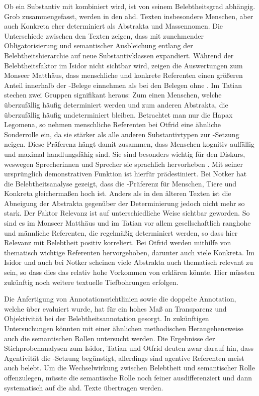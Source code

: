 Ob ein Substantiv mit  kombiniert wird, ist von seinem Belebtheitsgrad abhängig. Grob zusammengefasst, werden in den ahd. Texten insbesondere Menschen, aber auch Konkreta eher determiniert als Abstrakta und Massennomen. Die Unterschiede zwischen den Texten zeigen, dass  mit zunehmender Obligatorisierung und semantischer Ausbleichung entlang der Belebtheitshierarchie auf neue Substantivklassen expandiert. Während der Belebtheitsfaktor im Isidor nicht sichtbar wird, zeigen die Auswertungen zum Monseer Matthäus, dass menschliche und konkrete Referenten einen größeren Anteil innerhalb der -Belege einnehmen als bei den Belegen ohne . Im Tatian stechen zwei Gruppen signifikant heraus: Zum einen Menschen, welche überzufällig häufig determiniert werden und zum anderen Abstrakta, die überzufällig häufig undeterminiert bleiben. Betrachtet man nur die Hapax Legomena, so nehmen menschliche Referenten bei Otfrid eine ähnliche Sonderrolle ein, da sie stärker als alle anderen Substantivtypen zur -Setzung neigen. Diese Präferenz hängt damit zusammen, dass Menschen kognitiv auffällig und maximal handlungsfähig sind. Sie sind besonders wichtig für den Diskurs, weswegen Sprecherinnen und Sprecher sie sprachlich hervorheben . Mit seiner ursprünglich demonstrativen Funktion ist  hierfür prädestiniert.  
Bei Notker hat die Belebtheitsanalyse gezeigt, dass die  -Präferenz für Menschen, Tiere und Konkreta gleichermaßen hoch ist. Anders als in den älteren Texten ist die Abneigung der Abstrakta gegenüber der Determinierung jedoch nicht mehr so stark. Der Faktor Relevanz ist auf unterschiedliche Weise sichtbar geworden. So sind es im Monseer Matthäus und im Tatian vor allem gesellschaftlich ranghohe und männliche Referenten, die regelmäßig determiniert werden, so dass hier Relevanz mit Belebtheit positiv korreliert. Bei Otfrid werden mithilfe von  thematisch wichtige Referenten hervorgehoben, darunter auch viele Konkreta. Im Isidor und auch bei Notker scheinen viele Abstrakta auch thematisch relevant zu sein, so dass dies das relativ hohe Vorkommen von  erklären könnte. Hier müssten zukünftig noch weitere textuelle Tiefbohrungen erfolgen.

Die Anfertigung von Annotationsrichtlinien \parencite[dokumentiert in][]{HZKYL4_2020} sowie die doppelte Annotation, welche über  evaluiert wurde, hat für ein hohes Maß an Transparenz und Objektivität bei der Belebtheitsannotation gesorgt. In zukünftigen Untersuchungen könnten mit einer ähnlichen methodischen Herangehensweise auch die semantischen Rollen untersucht werden. Die Ergebnisse der Stichprobenanalysen zum Isidor, Tatian und Otfrid deuten zwar darauf hin, dass Agentivität die -Setzung begünstigt, allerdings sind agentive Referenten meist auch belebt. Um die Wechselwirkung zwischen Belebtheit und semantischer Rolle offenzulegen, müsste die semantische Rolle noch feiner ausdifferenziert und dann systematisch auf die ahd. Texte übertragen werden. 

